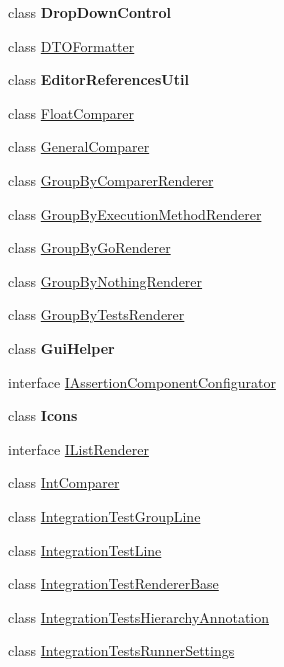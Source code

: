 \begin{DoxyCompactItemize}
\item 
class {\bfseries Drop\+Down\+Control}
\item 
class \hyperlink{class_unity_test_1_1_d_t_o_formatter}{D\+T\+O\+Formatter}
\item 
class {\bfseries Editor\+References\+Util}
\item 
class \hyperlink{class_unity_test_1_1_float_comparer}{Float\+Comparer}
\item 
class \hyperlink{class_unity_test_1_1_general_comparer}{General\+Comparer}
\item 
class \hyperlink{class_unity_test_1_1_group_by_comparer_renderer}{Group\+By\+Comparer\+Renderer}
\item 
class \hyperlink{class_unity_test_1_1_group_by_execution_method_renderer}{Group\+By\+Execution\+Method\+Renderer}
\item 
class \hyperlink{class_unity_test_1_1_group_by_go_renderer}{Group\+By\+Go\+Renderer}
\item 
class \hyperlink{class_unity_test_1_1_group_by_nothing_renderer}{Group\+By\+Nothing\+Renderer}
\item 
class \hyperlink{class_unity_test_1_1_group_by_tests_renderer}{Group\+By\+Tests\+Renderer}
\item 
class {\bfseries Gui\+Helper}
\item 
interface \hyperlink{interface_unity_test_1_1_i_assertion_component_configurator}{I\+Assertion\+Component\+Configurator}
\item 
class {\bfseries Icons}
\item 
interface \hyperlink{interface_unity_test_1_1_i_list_renderer}{I\+List\+Renderer}
\item 
class \hyperlink{class_unity_test_1_1_int_comparer}{Int\+Comparer}
\item 
class \hyperlink{class_unity_test_1_1_integration_test_group_line}{Integration\+Test\+Group\+Line}
\item 
class \hyperlink{class_unity_test_1_1_integration_test_line}{Integration\+Test\+Line}
\item 
class \hyperlink{class_unity_test_1_1_integration_test_renderer_base}{Integration\+Test\+Renderer\+Base}
\item 
class \hyperlink{class_unity_test_1_1_integration_tests_hierarchy_annotation}{Integration\+Tests\+Hierarchy\+Annotation}
\item 
class \hyperlink{class_unity_test_1_1_integration_tests_runner_settings}{Integration\+Tests\+Runner\+Settings}
\item 

\end{DoxyCompactItemize}
